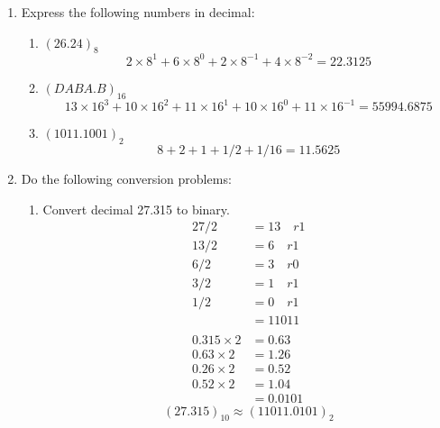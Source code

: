 \documentclass[12pt]{book}
\begin{document}
\begin{enumerate}
    \item Express the following numbers in decimal:
    \begin{enumerate}
        \item $(26.24)_{8}$
        $$2\times8^1+6\times8^0+2\times8^{-1}+4\times8^{-2} = 22.3125$$
        \item $(DABA.B)_{16}$
        $$13\times16^3+10\times16^2+11\times16^1+10\times16^0+11\times16^{-1} = 55994.6875$$
        \item $(1011.1001)_{2}$
        $$8+2+1+1/2+1/16 = 11.5625$$
    \end{enumerate}
    \newpage
    \item Do the following conversion problems:
    \begin{enumerate}
        \item Convert decimal 27.315 to binary.
        \begin{align*}
            27/2 &= 13 \quad r1\\
            13/2 &= 6 \quad r1\\
            6/2 &= 3 \quad r0\\
            3/2 &= 1 \quad r1\\
            1/2 &= 0 \quad r1\\
            &= 11011\\\\
            0.315\times2 &= 0.63\\
            0.63\times2 &= 1.26\\
            0.26\times2 &= 0.52\\
            0.52\times2 &= 1.04\\
            &= 0.0101
        \end{align*}
        $$(27.315)_{10} \approx (11011.0101)_2$$
        

\end{enumerate}
\end{enumerate}
\end{document}
